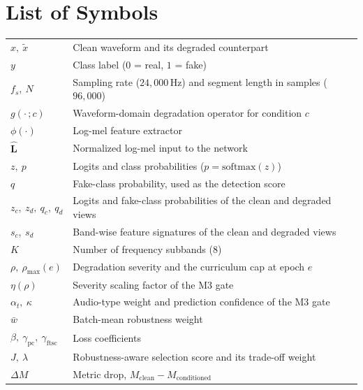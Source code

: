 \documentclass[12pt,a4paper]{report}
\begin{document}
\chapter*{List of Symbols}
\begingroup
\singlespacing\small
\renewcommand{\arraystretch}{1.25}
\noindent
\begin{tabular}{@{}p{}p{}@{}}
$x,\ \tilde{x}$ & Clean waveform and its degraded counterpart \\
$y$ & Class label ($0$ = real, $1$ = fake) \\
$f_s,\ N$ & Sampling rate ($24{,}000$\,Hz) and segment length in samples ($96{,}000$) \\
$g(\cdot\,;c)$ & Waveform-domain degradation operator for condition $c$ \\
$\phi(\cdot)$ & Log-mel feature extractor \\
$\hat{\mathbf{L}}$ & Normalized log-mel input to the network \\
$z,\ p$ & Logits and class probabilities ($p=\mathrm{softmax}(z)$) \\
$q$ & Fake-class probability, used as the detection score \\
$z_c,\ z_d,\ q_c,\ q_d$ & Logits and fake-class probabilities of the clean and degraded views \\
$s_c,\ s_d$ & Band-wise feature signatures of the clean and degraded views \\
$K$ & Number of frequency subbands ($8$) \\
$\rho,\ \rho_{\max}(e)$ & Degradation severity and the curriculum cap at epoch $e$ \\
$\eta(\rho)$ & Severity scaling factor of the M3 gate \\
$\alpha_t,\ \kappa$ & Audio-type weight and prediction confidence of the M3 gate \\
$\bar{w}$ & Batch-mean robustness weight \\
$\beta,\ \gamma_{\mathrm{pc}},\ \gamma_{\mathrm{ftsc}}$ & Loss coefficients \\
$J,\ \lambda$ & Robustness-aware selection score and its trade-off weight \\
$\Delta M$ & Metric drop, $M_{\mathrm{clean}}-M_{\mathrm{conditioned}}$ \\
\end{tabular}
\endgroup


\clearpage
{}
\pagestyle{fancy}
\end{document}
